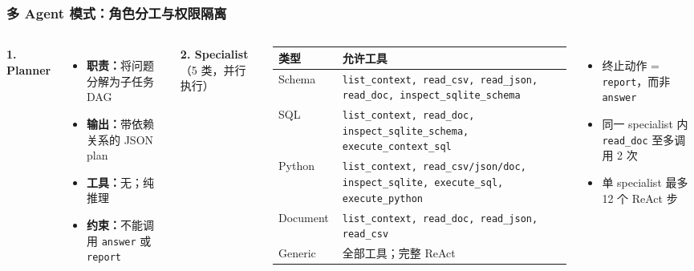 \documentclass[11pt, aspectratio=169]{beamer}
\begin{document}
\begin{frame}[t]
\frametitle{多 Agent 模式：角色分工与权限隔离}

\vspace{-0.7em}
\scriptsize

\begin{columns}[T,onlytextwidth]


\textbf{1. Planner}
\begin{itemize}
    \setlength\itemsep{0.05em}
    \item \textbf{职责：}将问题分解为子任务 DAG
    \item \textbf{输出：}带依赖关系的 JSON plan
    \item \textbf{工具：}无；纯推理
    \item \textbf{约束：}不能调用 \texttt{answer} 或 \texttt{report}
\end{itemize}

\vspace{0.25em}

\textbf{2. Specialist}（5 类，并行执行）

\vspace{0.1em}
\tiny
\begin{tabular}{@{}p{0.19\linewidth}p{0.75\linewidth}@{}}
\toprule
\textbf{类型} & \textbf{允许工具} \\
\midrule
Schema &
\texttt{list\_context, read\_csv, read\_json, read\_doc, inspect\_sqlite\_schema} \\

SQL &
\texttt{list\_context, read\_doc, inspect\_sqlite\_schema, execute\_context\_sql} \\

Python &
\texttt{list\_context, read\_csv/json/doc, inspect\_sqlite, execute\_sql, execute\_python} \\

Document &
\texttt{list\_context, read\_doc, read\_json, read\_csv} \\

Generic &
全部工具；完整 ReAct \\
\bottomrule
\end{tabular}

\vspace{0.25em}
\scriptsize
\begin{itemize}
    \setlength\itemsep{0.05em}
    \item 终止动作 = \texttt{report}，而非 \texttt{answer}
    \item 同一 specialist 内 \texttt{read\_doc} 至多调用 2 次
    \item 单 specialist 最多 12 个 ReAct 步
\end{itemize}


\end{columns}
\end{frame}
\end{document}
